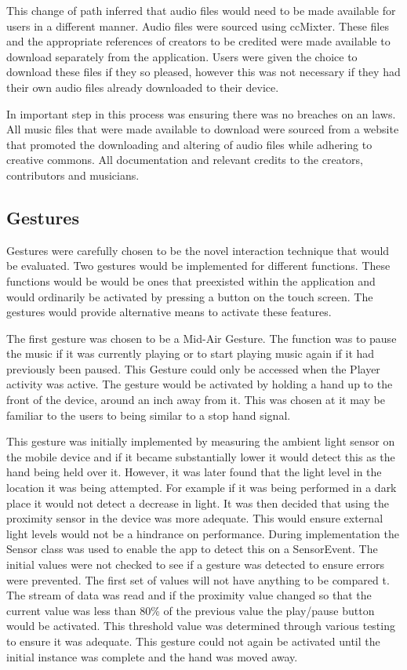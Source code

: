 \documentclass{l4proj}
\begin{document}
This change of path inferred that audio files would need to be made available for users in a different manner. Audio files were sourced using ccMixter. These files and the appropriate references of creators to be credited were made available to download separately from the application. Users were given the choice to download these files if they so pleased, however this was not necessary if they had their own audio files already downloaded to their device.

In important step in this process was ensuring there was no breaches on an laws. All music files that were made available to download were sourced from a website that promoted the downloading and altering of audio files while adhering to creative commons. All documentation and relevant credits to the creators, contributors and musicians.


\subsection{Gestures}

Gestures were carefully chosen to be the novel interaction technique that would be evaluated. Two gestures would be implemented for different functions. These functions would be would be ones that preexisted within the application and would ordinarily be activated by pressing a button on the touch screen. The gestures would provide alternative means to activate these features.

The first gesture was chosen to be a Mid-Air Gesture. The function was to pause the music if it was currently playing or to start playing music again if it had previously been paused. This Gesture could only be accessed when the Player activity was active. The gesture would be activated by holding a hand up to the front of the device, around an inch away from it. This was chosen at it may be familiar to the users to being similar to a stop hand signal. 

This gesture was initially implemented by measuring the ambient light sensor on the mobile device and if it became substantially lower it would detect this as the hand being held over it. However, it was later found that the light level in the location it was being attempted. For example if it was being performed in a dark place it would not detect a decrease in light. It was then decided that using the proximity sensor in the device was more adequate. This would ensure external light levels would not be a hindrance on performance. During implementation the Sensor class was used to enable the app to detect this on a SensorEvent. The initial values were not checked to see if a gesture was detected to ensure errors were prevented. The first set of values will not have anything to be compared t. The stream of data was read and if the proximity value changed so that the current value was less than 80\% of the previous value the play/pause button would be activated. This threshold value was determined through various testing to ensure it was adequate. This gesture could not again be activated until the initial instance was complete and the hand was moved away.
\end{document}
